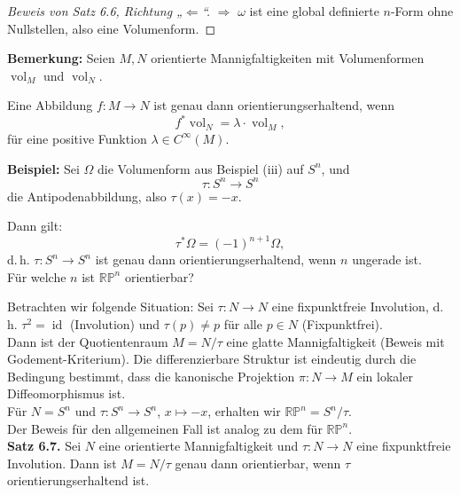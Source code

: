 \documentclass[fleqn, 12pt, letterpaper]{article}
\begin{document}
\begin{proof}[Beweis von Satz 6.6, Richtung „\(\Leftarrow\)“]
\(\Rightarrow\) \( \omega \) ist eine global definierte \( n \)-Form ohne Nullstellen, also eine Volumenform.
\end{proof}



\textbf{Bemerkung:}  
Seien \( M, N \) orientierte Mannigfaltigkeiten mit Volumenformen \( \operatorname{vol}_M \) und \( \operatorname{vol}_N \).  

Eine Abbildung \( f : M \to N \) ist genau dann orientierungserhaltend, wenn
\[
f^* \operatorname{vol}_N = \lambda \cdot \operatorname{vol}_M,
\]
für eine positive Funktion \( \lambda \in C^\infty(M) \).

\vspace{1em}

\textbf{Beispiel:}  
Sei \( \Omega \) die Volumenform aus Beispiel (iii) auf \( S^n \), und  
\[
\tau : S^n \to S^n
\]
die Antipodenabbildung, also \( \tau(x) = -x \).

Dann gilt:
\[
\tau^* \Omega = (-1)^{n+1} \Omega,
\]
d.\,h. \( \tau : S^n \to S^n \) ist genau dann orientierungserhaltend, wenn \( n \) ungerade ist.\\

Für welche \( n \) ist \( \mathbb{RP}^n \) orientierbar?

Betrachten wir folgende Situation:  
Sei \( \tau : N \to N \) eine fixpunktfreie Involution,  
d.\,h. \( \tau^2 = \operatorname{id} \) (Involution) und \( \tau(p) \neq p \)  für alle \( p \in N \) (Fixpunktfrei).\\

Dann ist der Quotientenraum \( M = N/\tau \) eine glatte Mannigfaltigkeit (Beweis mit Godement-Kriterium). Die differenzierbare Struktur ist eindeutig durch die Bedingung bestimmt,  
dass die kanonische Projektion
\(
\pi : N \to M
\)
ein lokaler Diffeomorphismus ist.\\

Für \( N = S^n \) und \( \tau : S^n \to S^n \), \( x \mapsto -x \),  
erhalten wir \( \mathbb{RP}^n = S^n / \tau \).\\

Der Beweis für den allgemeinen Fall ist analog zu dem für \( \mathbb{RP}^n \).\\

\textbf{Satz 6.7.}  
Sei \( N \) eine orientierte Mannigfaltigkeit und \( \tau : N \to N \) eine fixpunktfreie Involution.  
Dann ist \( M = N / \tau \) genau dann orientierbar, wenn \( \tau \) orientierungserhaltend ist.

\vspace{1em}
\end{document}
